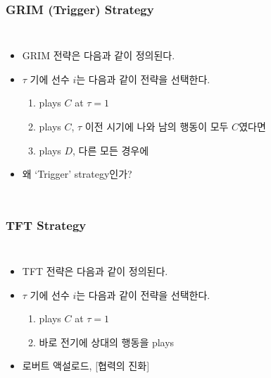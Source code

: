 \documentclass[final]{beamer}
\begin{document}
\begin{frame}\frametitle{GRIM (Trigger) Strategy}\vspace{3.5em}
\begin{columns}[c]
\column{18em}
\begin{itemize}
	\item GRIM 전략은 다음과 같이 정의된다. 
	\item $\tau$ 기에 선수 $i$는 다음과 같이 전략을 선택한다. 
	\begin{enumerate}
		\item plays $C$ at $\tau=1$
		\item plays $C$, $\tau$ 이전 시기에 나와 남의 행동이 모두 $C$였다면
		\item plays $D$, 다른 모든 경우에 
	\end{enumerate}
	\item 왜 `Trigger' strategy인가? 
\end{itemize}
\column{13em}
\hspace{-1em}
\end{columns}
\end{frame}

\begin{frame}\frametitle{TFT Strategy}\vspace{1em}
\begin{columns}[c]
\column{18em}
\begin{itemize}
	\item TFT 전략은 다음과 같이 정의된다. 
	\item $\tau$ 기에 선수 $i$는 다음과 같이 전략을 선택한다. 
	\begin{enumerate}
		\item plays $C$ at $\tau=1$
		\item 바로 전기에 상대의 행동을 plays 
	\end{enumerate}
	\item 로버트 액설로드, [협력의 진화] 
\end{itemize}
\column{13em}
\hspace{-1em}
\end{columns}
\end{frame}
\end{document}

